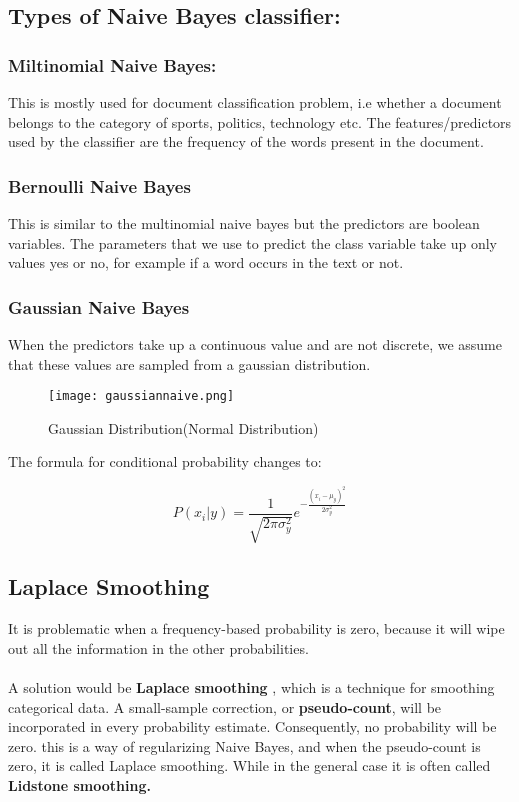 \subsection*{Types of Naive Bayes classifier:}
	\subsubsection*{Miltinomial Naive Bayes:}
		This is mostly used for document classification problem, i.e whether a document belongs to the category of sports, politics, technology etc. The features/predictors used by the classifier are the frequency of the words present in the document.

	\subsubsection*{Bernoulli Naive Bayes}
		This is similar to the multinomial naive bayes but the predictors are boolean variables. The parameters that we use to predict the class variable take up only values yes or no, for example if a word occurs in the text or not.

	\subsubsection*{Gaussian Naive Bayes}
		When the predictors take up a continuous value and are not discrete, we assume that these values are sampled from a gaussian distribution.

		\begin{figure}[h]
			\centering
			\texttt{[image: gaussiannaive.png]}
			\caption{Gaussian Distribution(Normal Distribution)}
		\end{figure}

		The formula for conditional probability changes to:

		\begin{equation}
			P(x_i|y) = \frac{1}{\sqrt{2\pi\sigma_y^2}}e^{-\frac{(x_i-\mu_y)^2}{2\sigma_y^2}}
		\end{equation}

\subsection*{Laplace Smoothing}
	It is problematic when a frequency-based probability is zero, because it will wipe out all the information in the other probabilities.\\ \\
	A solution would be \textbf{Laplace smoothing} , which is a technique for smoothing categorical data. A small-sample correction, or \textbf{pseudo-count}, will be incorporated in every probability estimate. Consequently, no probability will be zero. this is a way of regularizing Naive Bayes, and when the pseudo-count is zero, it is called Laplace smoothing. While in the general case it is often called \textbf{Lidstone smoothing.}

